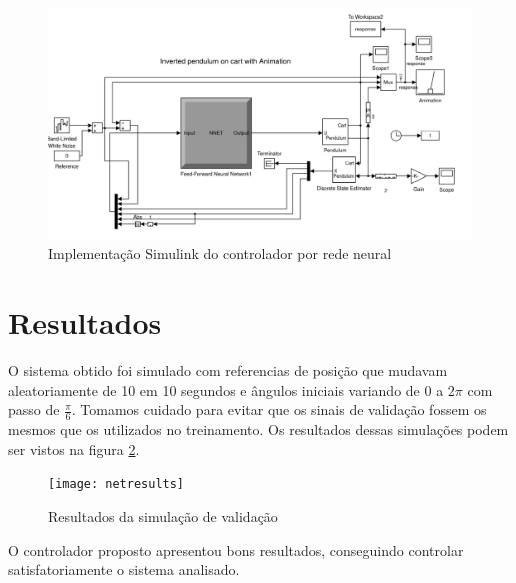 \documentclass{article}
\begin{document}
\begin{figure}[H]
	\centering
	\includegraphics[width=\linewidth]{net}
	\caption{Implementação Simulink do controlador por rede neural}
	\label{fig:net}
\end{figure}

\section{Resultados}
O sistema obtido foi simulado com referencias de posição que mudavam aleatoriamente de 10 em 10 segundos e ângulos iniciais variando de $0$ a $2\pi$ com passo de $\frac{\pi}{6}$. Tomamos cuidado para evitar que os sinais de validação fossem os mesmos que os utilizados no treinamento.
Os resultados dessas simulações podem ser vistos na figura \ref{fig:netresults}.
\begin{figure}[H]
	\centering
	\texttt{[image: netresults]}
	\caption{Resultados da simulação de validação}
	\label{fig:netresults}
\end{figure}

O controlador proposto apresentou bons resultados, conseguindo controlar satisfatoriamente o sistema analisado.
\pagebreak
\end{document}
